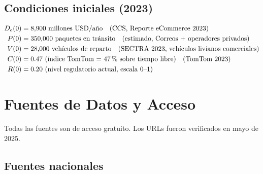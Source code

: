 \documentclass[12pt,a4paper]{article}
\begin{document}
\subsection{Condiciones iniciales (2023)}

\begin{align}
D_e(0) &= 8{,}900 \text{ millones USD/año}
  \quad \text{(CCS, Reporte eCommerce 2023)} \\
P(0)   &= 350{,}000 \text{ paquetes en tránsito}
  \quad \text{(estimado, Correos + operadores privados)} \\
V(0)   &= 28{,}000 \text{ vehículos de reparto}
  \quad \text{(SECTRA 2023, vehículos livianos comerciales)} \\
C(0)   &= 0.47 \text{ (índice TomTom = 47\,\% sobre tiempo libre)}
  \quad \text{(TomTom 2023)} \\
R(0)   &= 0.20 \text{ (nivel regulatorio actual, escala 0--1)}
\end{align}

\section{Fuentes de Datos y Acceso}

\begin{databox}
Todas las fuentes son de acceso gratuito. Los URLs fueron verificados
en mayo de 2025.
\end{databox}

\subsection{Fuentes nacionales}
\end{document}
